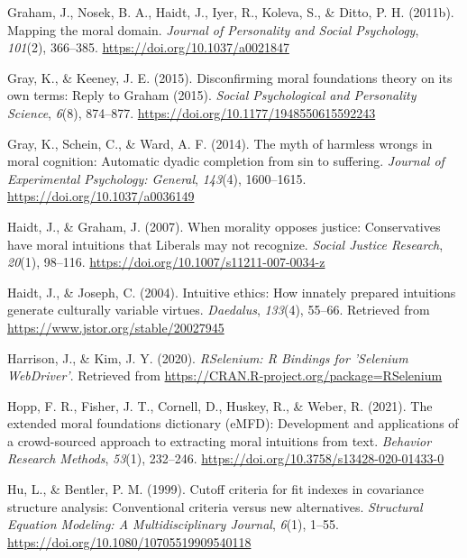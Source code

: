 \documentclass[
  man,floatsintext]{apa6}
\newlength{\cslhangindent}
\newenvironment{CSLReferences}[2] %
 {\begin{list}{}{%
  \setlength{\itemindent}{0pt}
  \setlength{\leftmargin}{0pt}
  \setlength{\parsep}{0pt}
  \ifodd #1
   \setlength{\leftmargin}{\cslhangindent}
   \setlength{\itemindent}{-1\cslhangindent}
  \fi
  \setlength{\itemsep}{#2\baselineskip}}}
 {\end{list}}
\begin{document}
\begin{CSLReferences}{1}{0}
Graham, J., Nosek, B. A., Haidt, J., Iyer, R., Koleva, S., \& Ditto, P. H. (2011b). {Mapping the moral domain.} \emph{Journal of Personality and Social Psychology}, \emph{101}(2), 366--385. \url{https://doi.org/10.1037/a0021847}

Gray, K., \& Keeney, J. E. (2015). Disconfirming moral foundations theory on its own terms: Reply to {G}raham (2015). \emph{Social Psychological and Personality Science}, \emph{6}(8), 874--877. \url{https://doi.org/10.1177/1948550615592243}

Gray, K., Schein, C., \& Ward, A. F. (2014). The myth of harmless wrongs in moral cognition: Automatic dyadic completion from sin to suffering. \emph{Journal of Experimental Psychology: General}, \emph{143}(4), 1600--1615. \url{https://doi.org/10.1037/a0036149}

Haidt, J., \& Graham, J. (2007). {When morality opposes justice: Conservatives have moral intuitions that Liberals may not recognize}. \emph{Social Justice Research}, \emph{20}(1), 98--116. \url{https://doi.org/10.1007/s11211-007-0034-z}

Haidt, J., \& Joseph, C. (2004). Intuitive ethics: How innately prepared intuitions generate culturally variable virtues. \emph{Daedalus}, \emph{133}(4), 55--66. Retrieved from \url{https://www.jstor.org/stable/20027945}

Harrison, J., \& Kim, J. Y. (2020). \emph{{RSelenium}: {R} {Bindings} for '{Selenium} {WebDriver}'}. Retrieved from \url{https://CRAN.R-project.org/package=RSelenium}

Hopp, F. R., Fisher, J. T., Cornell, D., Huskey, R., \& Weber, R. (2021). The extended moral foundations dictionary (eMFD): Development and applications of a crowd-sourced approach to extracting moral intuitions from text. \emph{Behavior Research Methods}, \emph{53}(1), 232--246. \url{https://doi.org/10.3758/s13428-020-01433-0}

Hu, L., \& Bentler, P. M. (1999). Cutoff criteria for fit indexes in covariance structure analysis: Conventional criteria versus new alternatives. \emph{Structural Equation Modeling: A Multidisciplinary Journal}, \emph{6}(1), 1--55. \url{https://doi.org/10.1080/10705519909540118}


\end{CSLReferences}
\end{document}
